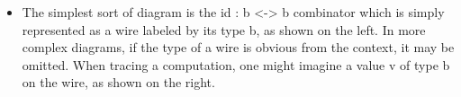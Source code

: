 \documentclass{llncs}
\begin{document}
\begin{itemize}
\item The simplest sort of diagram is the {{id : b <-> b}} combinator which
  is simply represented as a wire labeled by its type {{b}}, as shown on the
  left. In more complex diagrams, if the type of a wire is obvious from the
  context, it may be omitted. When tracing a computation, one might imagine a
  value {{v}} of type {{b}} on the wire, as shown on the right.

  \begin{multicols}{2}
\begin{center}
\end{center}
\begin{center}
\end{center}
  \end{multicols}


\end{itemize}
\end{document}
